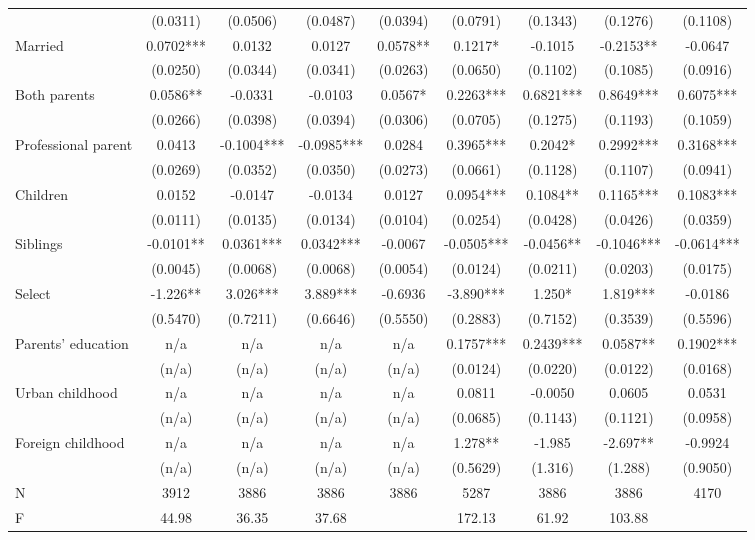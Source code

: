 \documentclass[12pt]{report}
\begin{document}
\begin{sidewaystable}
\begin{tabular}{lc|c|c|c|c|c|c|c}
& (0.0311) & (0.0506) & (0.0487) & (0.0394) & (0.0791) & (0.1343) & (0.1276) & (0.1108)\\
Married & 0.0702*** & 0.0132 & 0.0127 & 0.0578** & 0.1217* & -0.1015 & -0.2153** & -0.0647\\
& (0.0250) & (0.0344) & (0.0341) & (0.0263) & (0.0650) & (0.1102) & (0.1085) & (0.0916)\\
Both parents & 0.0586** & -0.0331 & -0.0103 & 0.0567* & 0.2263*** & 0.6821*** & 0.8649*** & 0.6075***\\
& (0.0266) & (0.0398) & (0.0394) & (0.0306) & (0.0705) & (0.1275) & (0.1193) & (0.1059)\\
Professional parent & 0.0413 & -0.1004*** & -0.0985*** & 0.0284 & 0.3965*** & 0.2042* & 0.2992*** & 0.3168***\\
& (0.0269) & (0.0352) & (0.0350) & (0.0273) & (0.0661) & (0.1128) & (0.1107) & (0.0941)\\
Children & 0.0152 & -0.0147 & -0.0134 & 0.0127 & 0.0954*** & 0.1084** & 0.1165*** & 0.1083***\\
& (0.0111) & (0.0135) & (0.0134) & (0.0104) & (0.0254) & (0.0428) & (0.0426) & (0.0359)\\
Siblings & -0.0101** & 0.0361*** & 0.0342*** & -0.0067 & -0.0505*** & -0.0456** & -0.1046*** & -0.0614***\\
& (0.0045) & (0.0068) & (0.0068) & (0.0054) & (0.0124) & (0.0211) & (0.0203) & (0.0175)\\
Select & -1.226** & 3.026*** & 3.889*** & -0.6936 & -3.890*** & 1.250* & 1.819*** & -0.0186\\
& (0.5470) & (0.7211) & (0.6646) & (0.5550) & (0.2883) & (0.7152) & (0.3539) & (0.5596)\\
Parents' education & n/a & n/a & n/a & n/a & 0.1757*** & 0.2439*** & 0.0587** & 0.1902***\\
& (n/a) & (n/a) & (n/a) & (n/a) & (0.0124) & (0.0220) & (0.0122) & (0.0168)\\
Urban childhood & n/a & n/a & n/a & n/a & 0.0811 & -0.0050 & 0.0605 & 0.0531\\
& (n/a) & (n/a) & (n/a) & (n/a) & (0.0685) & (0.1143) & (0.1121) & (0.0958)\\
Foreign childhood & n/a & n/a & n/a & n/a & 1.278** & -1.985 & -2.697** & -0.9924\\
& (n/a) & (n/a) & (n/a) & (n/a) & (0.5629) & (1.316) & (1.288) & (0.9050)\\
\hline
N & 3912 & 3886 & 3886 & 3886 & 5287 & 3886 & 3886 & 4170\\
F & 44.98 & 36.35 & 37.68 & & 172.13 & 61.92 & 103.88 & \\

\end{tabular}
\end{sidewaystable}
\end{document}
